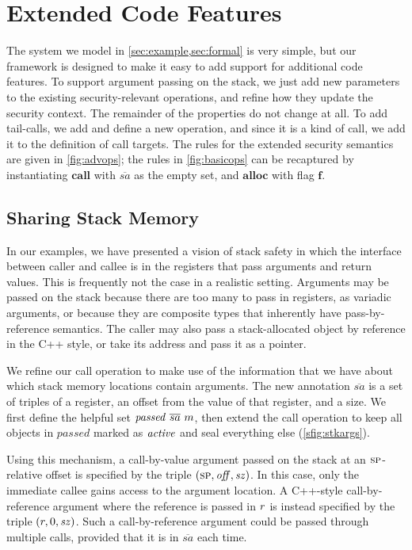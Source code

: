 \documentclass[10pt,conference]{ieeetran}%
\theoremstyle{definition}
\begin{document}
\section{Extended Code Features}
\label{sec:extensions}

The system we model in \cref{sec:example,sec:formal} is very simple, but our framework
is designed to make it easy to add support for additional code features. To support argument passing on the stack,
we just add new parameters to the existing security-relevant operations, and refine how they
update the security context. The remainder of the properties do not change at all.
To add tail-calls, we add and define a new operation, and since it is a kind of call,
we add it to the definition of call targets.
The rules for the extended security semantics are given in \cref{fig:advops}; the
rules in \cref{fig:basicops} can be recaptured by instantiating
\(\mathbf{call}\) with \(\overline{sa}\) as the empty set, and \(\mathbf{alloc}\)
with flag \(\mathbf{f}\).

\subsection{Sharing Stack Memory}
In our examples, we have presented a vision of stack safety in which
the interface between caller and callee is in the registers that pass
arguments and return values. This is frequently not the case in a realistic
setting. Arguments may be passed on the stack because there are too many
to pass in registers, as %
variadic arguments, or
because they are composite types that inherently have
pass-by-reference semantics. The caller may also pass a stack-allocated  object by reference
in the C++ style, or take its address and pass it as a pointer.

We refine our call operation to make use of the information that we have about
which stack memory locations contain arguments. The new annotation \(\overline{sa}\) is a set of
triples of a register, an offset from the value of that register, and a size.
We first define the helpful set \(\mathit{passed} ~ \overline{sa} ~ m\),
then extend the call operation to keep all objects in \(\mathit{passed}\) marked
as \(\mathit{active}\) and seal everything else (\cref{sfig:stkargs}).

Using this mechanism, a call-by-value argument passed on the stack at an \(\textsc{sp}\)-relative offset
is specified by the triple \((\textsc{sp}, \mathit{off}, \mathit{sz})\).
In this case, only the immediate callee gains access to the argument location.
A C++-style call-by-reference argument where the reference is passed in \(r\)
is instead specified by the triple \((r, 0, \mathit{sz})\). Such a call-by-reference
argument could be passed through multiple calls, provided that it is in \(\overline{sa}\)
each time.
\end{document}
